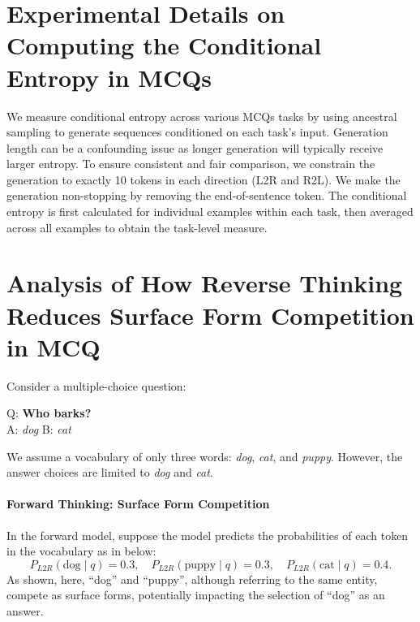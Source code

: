 \section{Experimental Details on Computing the Conditional Entropy in MCQs}
\label{app:ce}
We measure conditional entropy across various MCQs tasks by using ancestral sampling to generate sequences conditioned on each task's input. Generation length can be a confounding issue as longer generation will typically receive larger 
entropy. 
To ensure consistent and fair comparison, we constrain the generation to exactly 10 tokens in each direction (L2R and R2L). We make the generation non-stopping by removing the end-of-sentence token. The conditional entropy is first calculated for individual examples within each task, then averaged across all examples to obtain the task-level measure.






















\section{Analysis of How Reverse Thinking Reduces Surface Form Competition in MCQ}
\label{app:surface}
Consider a multiple-choice question:

\begin{center}
    Q: \textbf{Who barks?} \\
    A: \textit{dog} \quad B: \textit{cat}
\end{center}

We assume a vocabulary of only three words: \textit{dog}, \textit{cat}, and \textit{puppy}. However, the answer choices are limited to \textit{dog} and \textit{cat}.

\paragraph{Forward Thinking: Surface Form Competition}
In the forward model, suppose the model predicts the probabilities of each token in the vocabulary as in below:
\[
P_{L2R}(\text{dog} \mid q) = 0.3, \quad P_{L2R}(\text{puppy} \mid q) = 0.3, \quad P_{L2R}(\text{cat} \mid q) = 0.4.
\]
As \citet{holtzman-etal-2021-surface} shown, here, ``dog'' and ``puppy'', although referring to the same entity, compete as surface forms, potentially impacting the selection of ``dog'' as an answer.

